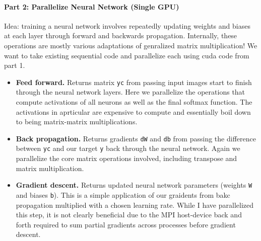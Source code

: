 \documentclass[12pt,letterpaper,twoside]{article}
\begin{document}
\paragraph{Part 2: Parallelize Neural Network (Single GPU)} Idea: training a neural
network involves repeatedly updating weights and biases at each layer through forward
and backwards propagation. Internally, these operations are mostly various adaptations
of genralized matrix multiplication! We want to take existing sequential code and 
parallelize each using cuda code from part 1.

\begin{itemize}
    \item \textbf{Feed forward.} Returns matrix \texttt{yc} from passing input images
    start to finish through the neural network layers. Here we parallelize the operations
    that compute activations of all neurons as well as the final softmax function. The 
    activations in aprticular are expensive to compute and essentially boil down to being 
    matrix-matrix multiplications. 

    \item \textbf{Back propagation.} Returns gradients \texttt{dW} and \texttt{db} from 
    passing the difference between \texttt{yc} and our target \texttt{y} back through the 
    neural network. Again we parallelize the core matrix operations involved, including
    transpose and matrix multiplication.

    \item \textbf{Gradient descent.} Returns updated neural network parameters (weights 
    \texttt{W} and biases \texttt{b}). This is a simple application of our graidents from 
    bakc propagation multiplied with a chosen learning rate. While I have parallelized this
    step, it is not clearly beneficial due to the MPI host-device back and forth required 
    to sum partial gradients across processes before gradient descent. 

\end{itemize}
\end{document}
